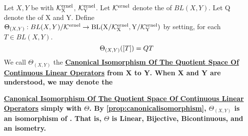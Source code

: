 \label{def:canonicalisomorphism}
\newcommand{\CanonicalIso}[0]{
    \bf \hyperref[def:canonicalisomorphism]{Canonical Isomorphism Of The Quotient Space Of Continuous Linear Operators} \rm
}

\begin{df}
    Let $X,Y$ be \SeminormedSpaces
    with \SeminormKernels $\bf\mathcal{K}\rm^{ernel}_X$, $\bf\mathcal{K}\rm^{ernel}_Y$.
    Let $\bf\mathcal{K}\rm^{ernel}$ denote the \SeminormKernel of $BL(X,Y)$. 
    Let Q denote the \OperatorQuotientMap of X and Y.
    Define $\Theta_{(X,Y)}:BL(X,Y)/\bf\mathcal{K}\rm^{ernel} \to BL(X/\bf\mathcal{K}\rm^{ernel}_X, Y/\bf\mathcal{K}\rm^{ernel}_Y)$ by 
    setting, for each $T \in BL(X,Y)$. 
    \begin{equation}
        \Theta_{(X,Y)}(\left[ T \right]) = QT
    \end{equation}
    We call $\Theta_{(X,Y)}$ the \CanonicalIso from X to Y. 
    When X and Y are understood, we may denote the
    \CanonicalIso simply with $\Theta$. 
    By \ref{prop:canonicalisomorphism}, $\Theta_{(X,Y)}$
    is an isomorphism of \NormedSpaces.
    That is, $\Theta$ is Linear, Bijective, Bicontinuous, and an isometry. 
\end{df}




